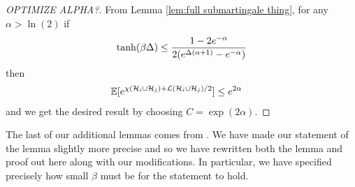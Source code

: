 \begin{proof}
		[OPTIMIZE ALPHA?]
		
		From Lemma \ref{lem:full submartingale thing}, for any $\alpha > \ln(2)$ if
		\begin{equation}
			\tanh(\beta\Delta) \leq \frac{1-2e^{-\alpha}}{2(e^{\Delta(\alpha+1)} - e^{-\alpha})}
		\end{equation}
		then
		\begin{align}
			\mathbb{E}[e^{\chi(\mathcal{H}_i\cup \mathcal{H}_j) + \mathcal{L}(\mathcal{H}_i\cup \mathcal{H}_j)/2} ] &\leq e^{2\alpha}
		\end{align}
		and we get the desired result by choosing $C = \exp(2\alpha)$.
	\end{proof}

	The last of our additional lemmas comes from \cite[Lemma 3.1]{Lubetzky2015-po}. We have made our statement of the lemma slightly more precise and so we have rewritten both the lemma and proof out here along with our modifications. In particular, we have specified precisely how small $\beta$ must be for the statement to hold.

